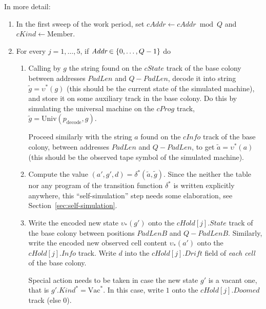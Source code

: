 \documentclass[12pt]{memoir}
\newcommand{\fld}[1]{\ensuremath{\textit{#1}}}
\renewcommand{\B}{B}
\newcommand{\Addr}{\fld{Addr}}
\newcommand{\cAddr}{\fld{cAddr}}
\newcommand{\Drift}{\fld{Drift}}
\newcommand{\Doomed}{\fld{Doomed}}
\newcommand{\cHold}{\fld{cHold}}
\newcommand{\Info}{\fld{Info}}
\newcommand{\cInfo}{\fld{cInfo}}
\newcommand{\Kind}{\fld{Kind}}
\newcommand{\cKind}{\fld{cKind}}
\newcommand{\cProg}{\fld{cProg}}
\newcommand{\State}{\fld{State}}
\newcommand{\cState}{\fld{cState}}
\newcommand{\decode}{\mathrm{decode}}
\newcommand{\Member}{\mathrm{Member}}
\newcommand{\PadLen}{\mathit{PadLen}}
\newcommand{\Un}{\mathrm{Univ}}
\newcommand{\Vacant}{\mathrm{Vac}}
\begin{document}
In more detail:
\begin{enumerate}
     \item   In the first sweep of the work period, set
      $\cAddr \gets \cAddr\bmod{Q}$ and $\cKind \gets \Member$.

      \item For every $j=1,\dots,5$, if $\Addr \in \set{0, \dots, Q-1}$ do

       \begin{enumerate}

          \item Calling by $g$ the  string found on the $\cState$ track of
            the base colony between addresses $\PadLen$
            and $Q-\PadLen$, decode it into string $\tilde g=\upsilon^{*}(g)$
            (this should be the current state of the simulated machine), and
            store it on some auxiliary track in the base colony.
            Do this by simulating the universal machine on the $\cProg$ track,
            $\tilde g = \Un(p_{\decode}, g)$.

            Proceed similarly with the string $a$ found on the $\cInfo$
            track of the base colony, between addresses $\PadLen$
            and $Q-\PadLen$, to get $\tilde a = \upsilon^{*}(a)$
            (this should be the observed tape symbol of the simulated machine).

          \item \label{i:comp.trans}
           Compute the value \( (a',g',d)=\delta^{*}(\tilde a, \tilde g) \).
Since the neither the table nor any program of the transition 
function \( \delta^{*} \) is written explicitly anywhere, this ``self-simulation'' step needs
some elaboration, see Section~\ref{sec:self-simulation}.

            \item\label{i:comp.write}
              Write the encoded new state $\upsilon_{*}(g')$ onto the
              $\cHold[j].\State$ track of the base colony between positions
              $\PadLen\B$ and $Q-\PadLen\B$.
              Similarly, write the encoded new observed cell
              content $\upsilon_{*}(a')$ onto the $\cHold[j].\Info$ track.
              Write $d$ into the $\cHold[j].\Drift$ field of \emph{each cell} of
              the base colony.

              Special action needs to be taken in case 
              the new state \( g' \) is a vacant one, that is 
              \( g'.\Kind^{*}=\Vacant^{*} \).
              In this case, write \( 1 \) onto the \( \cHold[j].\Doomed \) track (else 0).


\end{enumerate}
\end{enumerate}
\end{document}
